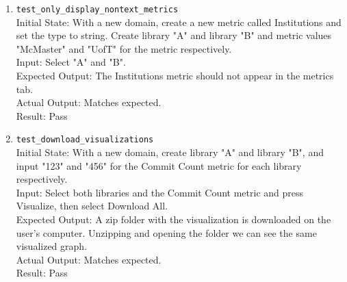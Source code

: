 \documentclass[12pt, titlepage]{article}
\begin{document}
\begin{enumerate}
    \\Result: Pass
    \item \texttt{test\_only\_display\_non\-text\_metrics} \label{test-only-display-non-text-metrics}
    \\Initial State: With a new domain, create a new metric called Institutions and set the type to string. Create library "A" and library "B" and metric values "McMaster" and "UofT" for the metric respectively.
    \\Input: Select "A" and "B".
    \\Expected Output: The Institutions metric should not appear in the metrics tab.
    \\Actual Output: Matches expected.
    \\Result: Pass
    \item \texttt{test\_download\_visualizations} \label{test-download-visualizations}
    \\Initial State: With a new domain, create library "A" and library "B", and input "123" and "456" for the Commit Count metric for each library respectively.
    \\Input: Select both libraries and the Commit Count metric and press Visualize, then select Download All.
    \\Expected Output: A zip folder with the visualization is downloaded on the user's computer. Unzipping and opening the folder we can see the same visualized graph.
    \\Actual Output: Matches expected.
    \\Result: Pass
\end{enumerate}
\end{document}
